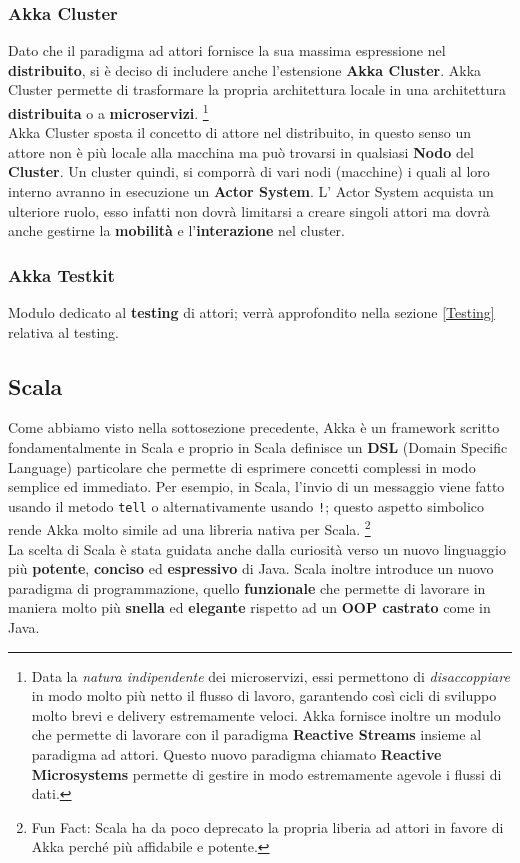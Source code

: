   \subsubsection{Akka Cluster}
  Dato che il paradigma ad attori fornisce la sua massima espressione nel \textbf{distribuito}, si è deciso di includere anche l'estensione \textbf{Akka Cluster}. Akka Cluster permette di trasformare la propria architettura locale in una architettura \textbf{distribuita} o a  \textbf{microservizi}.
  \footnote{ Data la \textit{natura indipendente} dei microservizi, essi permettono di \textit{disaccoppiare} in modo molto più netto il flusso di lavoro, garantendo così cicli di sviluppo molto brevi e delivery estremamente veloci. Akka fornisce inoltre un modulo che permette di lavorare con il paradigma \textbf{Reactive Streams} insieme al paradigma ad attori. Questo nuovo paradigma chiamato \textbf{Reactive Microsystems} permette di gestire in modo estremamente agevole i flussi di dati.}\\
  Akka Cluster sposta il concetto di attore nel distribuito, in questo senso un attore non è più locale alla macchina ma può trovarsi in qualsiasi \textbf{Nodo} del \textbf{Cluster}. Un cluster quindi, si comporrà di vari nodi (macchine) i quali al loro interno avranno in esecuzione un \textbf{Actor System}. L' Actor System acquista un ulteriore ruolo, esso infatti non dovrà limitarsi a creare singoli attori ma dovrà anche gestirne la \textbf{mobilità} e l'\textbf{interazione} nel cluster.
  \subsubsection{Akka Testkit}
  Modulo dedicato al \textbf{testing} di attori; verrà approfondito nella sezione \ref{Testing} relativa al testing.

\subsection{Scala}
Come abbiamo visto nella sottosezione precedente, Akka è un framework scritto fondamentalmente in Scala e proprio in Scala definisce un \textbf{DSL} (Domain Specific Language) particolare che permette di esprimere concetti complessi in modo semplice ed immediato. Per esempio, in Scala, l'invio di un messaggio viene fatto usando il metodo \texttt{tell} o alternativamente usando \texttt{!}; questo aspetto simbolico rende Akka molto simile ad una libreria nativa per Scala.
\footnote{Fun Fact: Scala ha da poco deprecato la propria liberia ad attori in favore di Akka perché più affidabile e potente.}\\
La scelta di Scala è stata guidata anche dalla curiosità verso un nuovo linguaggio più \textbf{potente}, \textbf{conciso} ed \textbf{espressivo} di Java. Scala inoltre introduce un nuovo paradigma di programmazione, quello \textbf{funzionale} che permette di lavorare in maniera molto più \textbf{snella} ed \textbf{elegante} rispetto ad un \textbf{OOP castrato} come in Java.


